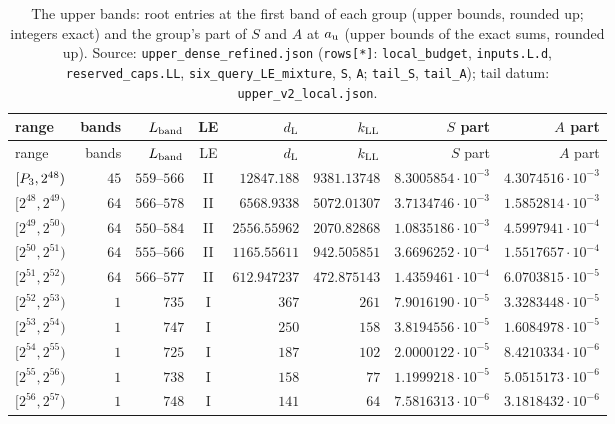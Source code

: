 {\scriptsize\setlength{\tabcolsep}{4pt}\renewcommand{\arraystretch}{0.92}
\begin{longtable}{@{}lrrcrrrr@{}}
\caption{The upper bands: root entries at the first band of each group (upper bounds, rounded up; integers exact) and the group's part of $S$ and $A$ at $a_{\rm u}$ (upper bounds of the exact sums, rounded up). Source: \texttt{upper\_dense\_refined.json} (\texttt{rows[*]}: \texttt{local\_budget}, \texttt{inputs.L.d}, \texttt{reserved\_caps.LL}, \texttt{six\_query\_LE\_mixture}, \texttt{S}, \texttt{A}; \texttt{tail\_S}, \texttt{tail\_A}); tail datum: \texttt{upper\_v2\_local.json}.}\label{tab:data:upper-bands}\\
\toprule
range & bands & $L_{\rm band}$ & LE & $d_{\rm L}$ & $k_{\rm LL}$ & $S$ part & $A$ part\\
\midrule
\endfirsthead
\toprule
range & bands & $L_{\rm band}$ & LE & $d_{\rm L}$ & $k_{\rm LL}$ & $S$ part & $A$ part\\
\midrule
\endhead
\bottomrule
\endfoot
$[P_3,2^{48})$ & $45$ & $559$--$566$ & II & $12847.188$ & $9381.13748$ & $8.3005854\cdot10^{-3}$ & $4.3074516\cdot10^{-3}$\\
$[2^{48},2^{49})$ & $64$ & $566$--$578$ & II & $6568.9338$ & $5072.01307$ & $3.7134746\cdot10^{-3}$ & $1.5852814\cdot10^{-3}$\\
$[2^{49},2^{50})$ & $64$ & $550$--$584$ & II & $2556.55962$ & $2070.82868$ & $1.0835186\cdot10^{-3}$ & $4.5997941\cdot10^{-4}$\\
$[2^{50},2^{51})$ & $64$ & $555$--$566$ & II & $1165.55611$ & $942.505851$ & $3.6696252\cdot10^{-4}$ & $1.5517657\cdot10^{-4}$\\
$[2^{51},2^{52})$ & $64$ & $566$--$577$ & II & $612.947237$ & $472.875143$ & $1.4359461\cdot10^{-4}$ & $6.0703815\cdot10^{-5}$\\
$[2^{52},2^{53})$ & $1$ & $735$ & I & $367$ & $261$ & $7.9016190\cdot10^{-5}$ & $3.3283448\cdot10^{-5}$\\
$[2^{53},2^{54})$ & $1$ & $747$ & I & $250$ & $158$ & $3.8194556\cdot10^{-5}$ & $1.6084978\cdot10^{-5}$\\
$[2^{54},2^{55})$ & $1$ & $725$ & I & $187$ & $102$ & $2.0000122\cdot10^{-5}$ & $8.4210334\cdot10^{-6}$\\
$[2^{55},2^{56})$ & $1$ & $738$ & I & $158$ & $77$ & $1.1999218\cdot10^{-5}$ & $5.0515173\cdot10^{-6}$\\
$[2^{56},2^{57})$ & $1$ & $748$ & I & $141$ & $64$ & $7.5816313\cdot10^{-6}$ & $3.1818432\cdot10^{-6}$\\

\end{longtable}}
